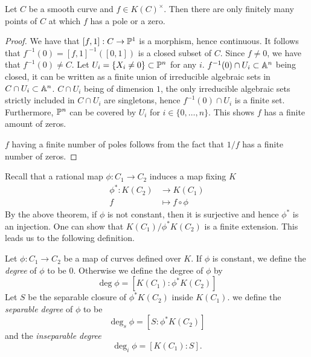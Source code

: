\begin{proposition}
	\label{prop:zero-finiteness}
	Let $C$ be a smooth curve and $f \in K(C)^\times$.
	Then there are only finitely 
	many points of $C$ at which $f$ has a pole or a zero.
\end{proposition}

\begin{proof}
	We have that $[f, 1]: C \to \mathbb{P}^1$ is a morphism, hence continuous.
	It follows that $f^{-1}(0) = [f, 1]^{-1}([0, 1])$ is a closed subset
	of $C$. Since $f \neq 0$, we have that $f^{-1}(0) \neq C$.
	Let $U_i = \{X_i \neq 0\} \subset \mathbb{P}^n$ for any $i$.
	$f^{-1}(0)\cap U_i \subset \mathbb{A}^n$ being closed,
	it can be written as a finite union of irreducible
	algebraic sets in $C\cap U_i \subset \mathbb{A}^n$.
	$C\cap U_i$ being of dimension $1$, the only irreducible algebraic
	sets strictly included in $C \cap U_i$ are singletons,
	hence $f^{-1}(0)\cap U_i$ is a finite set.
	Furthermore, $\mathbb{P}^n$ can be covered by $U_i$ for $i \in \{0, \dots, n\}$.
	This shows $f$ has a finite amount of zeros.

	$f$ having a finite number of poles follows from the
	fact that $1/f$ has a finite number of zeros.
\end{proof}


Recall that a rational map $\phi: C_1 \to C_2$ induces a map fixing $K$
\begin{align*}
	\phi^*: K(C_2) &\to K(C_1)\\
	f &\mapsto f\circ\phi
\end{align*}
By the above theorem, if $\phi$ is not constant, then it is surjective
and hence $\phi^*$ is an injection.
One can show that $K(C_1) / \phi^*K(C_2)$ is a finite extension. This leads
us to the following definition.

\begin{definition}
	Let $\phi: C_1 \to C_2$ be a map of curves defined over $K$.
	If $\phi$ is constant, we define the \emph{degree} of $\phi$ to be $0$.
	Otherwise we define the degree of $\phi$ by
	\begin{equation*}
		\deg\phi = [K(C_1): \phi^*K(C_2)]
	\end{equation*}
	Let $S$ be the separable closure of $\phi^*K(C_2)$ inside $K(C_1)$.
	we define the \emph{separable degree} of $\phi$ to be
	\begin{equation*}
		\deg_s\phi = [S: \phi^*K(C_2)]
	\end{equation*}
	and the \emph{inseparable degree}
	\begin{equation*}
		\deg_i\phi = [K(C_1): S].
	\end{equation*}
\end{definition}

